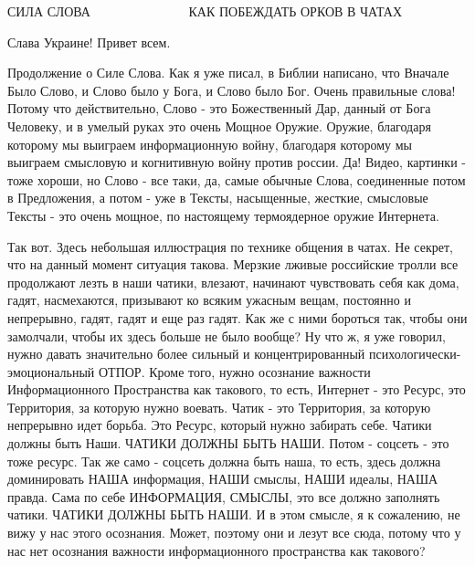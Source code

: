  
 
 
 
 

СИЛА СЛОВА 💛 💙 💛 💙 💛 💙 💛 💙 💛 💛 💙 💛            
КАК ПОБЕЖДАТЬ ОРКОВ В ЧАТАХ 

Слава Украине! Привет всем. 💛 💙 💛 💙 💛 💙 💛 💙 💛 💙 💛 💙 💛 💙              

Продолжение о Силе Слова. Как я уже писал, в Библии написано, что Вначале Было
Слово, и Слово было у Бога, и Слово было Бог. Очень правильные слова! Потому
что действительно, Слово - это Божественный Дар, данный от Бога Человеку, и в
умелый руках это очень Мощное Оружие.  Оружие, благодаря которому мы выиграем
информационную войну, благодаря которому мы выиграем смысловую и когнитивную
войну против россии. Да! Видео, картинки - тоже хороши, но Слово - все таки,
да, самые обычные Слова, соединенные потом в Предложения, а потом - уже в
Тексты, насыщенные, жесткие, смысловые Тексты - это очень мощное, по настоящему
термоядерное оружие Интернета.

Так вот. Здесь небольшая иллюстрация по технике общения в чатах. Не секрет, что
на данный момент ситуация такова. Мерзкие лживые российские тролли все
продолжают лезть в наши чатики, влезают, начинают чувствовать себя как дома,
гадят, насмехаются, призывают ко всяким ужасным вещам, постоянно и непрерывно,
гадят, гадят и еще раз гадят. Как же с ними бороться так, чтобы они замолчали,
чтобы их здесь больше не было вообще? Ну что ж, я уже говорил, нужно давать
значительно более сильный и концентрированный психологически-эмоциональный
ОТПОР. Кроме того, нужно осознание важности Информационного Пространства как
такового, то есть, Интернет - это Ресурс, это Территория, за которую нужно
воевать. Чатик - это Территория, за которую непрерывно идет борьба. Это Ресурс,
который нужно забирать себе. Чатики должны быть Наши. ЧАТИКИ ДОЛЖНЫ БЫТЬ НАШИ.
Потом - соцсеть - это тоже ресурс. Так же само - соцсеть должна быть наша, то
есть, здесь должна доминировать НАША информация, НАШИ смыслы, НАШИ идеалы, НАША
правда. Сама по себе ИНФОРМАЦИЯ, СМЫСЛЫ, это все должно заполнять чатики.
ЧАТИКИ ДОЛЖНЫ БЫТЬ НАШИ. И в этом смысле, я к сожалению, не вижу у нас этого
осознания. Может, поэтому они и лезут все сюда, потому что у нас нет осознания
важности информационного пространства как такового?

